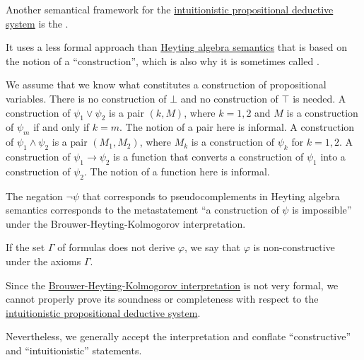 \begin{remark}\label{rem:brouwer_heyting_kolmogorov_interpretation}
  Another semantical framework for the \hyperref[def:intuitionistic_propositional_deductive_systems]{intuitionistic propositional deductive system} is the .

  It uses a less formal approach than \hyperref[def:propositional_heyting_algebra_semantics]{Heyting algebra semantics} that is based on the notion of a \enquote{construction}, which is also why it is sometimes called .

  \begin{thmenum}
     We assume that we know what constitutes a construction of propositional variables.
     There is no construction of \( \bot \) and no construction of \( \top \) is needed.
     A construction of \( \psi_1 \vee \psi_2 \) is a pair \( (k, M) \), where \( k = 1, 2 \) and \( M \) is a construction of \( \psi_m \) if and only if \( k = m \). The notion of a pair here is informal.
     A construction of \( \psi_1 \wedge \psi_2 \) is a pair \( (M_1, M_2) \), where \( M_k \) is a construction of \( \psi_k \) for \( k = 1, 2 \).
     A construction of \( \psi_1 \rightarrow \psi_2 \) is a function that converts a construction of \( \psi_1 \) into a construction of \( \psi_2 \). The notion of a function here is informal.
  \end{thmenum}

  The negation \( \neg\psi \) that corresponds to pseudocomplements in Heyting algebra semantics corresponds to the metastatement \enquote{a construction of \( \psi \) is impossible} under the Brouwer-Heyting-Kolmogorov interpretation.

  If the set \( \Gamma \) of formulas does not derive \( \varphi \), we say that \( \varphi \) is non-constructive under the axioms \( \Gamma \).
\end{remark}

\begin{remark}\label{rem:brouwer_heyting_kolmogorov_interpretation_compatibility}
  Since the \hyperref[rem:brouwer_heyting_kolmogorov_interpretation]{Brouwer-Heyting-Kolmogorov interpretation} is not very formal, we cannot properly prove its soundness or completeness with respect to the \hyperref[def:intuitionistic_propositional_deductive_systems]{intuitionistic propositional deductive system}.

  Nevertheless, we generally accept the interpretation and conflate \enquote{constructive} and \enquote{intuitionistic} statements.
\end{remark}

